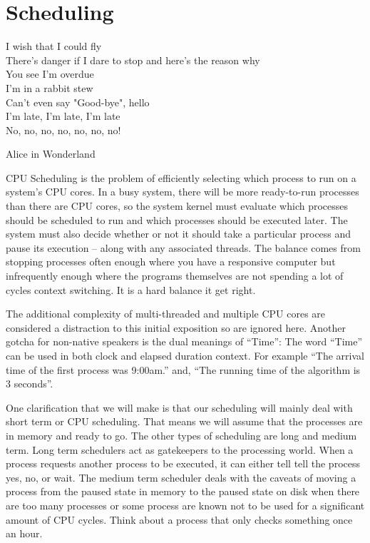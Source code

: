 \chapter{Scheduling}

\epigraph{I wish that I could fly\\
There's danger if I dare to stop and here's the reason why\\
You see I'm overdue\\
I'm in a rabbit stew\\
Can't even say "Good-bye", hello\\
I'm late, I'm late, I'm late\\
No, no, no, no, no, no, no!}{Alice in Wonderland}

CPU Scheduling is the problem of efficiently selecting which process to run on a system's CPU cores.
In a busy system, there will be more ready-to-run processes than there are CPU cores, so the system kernel must evaluate which processes should be scheduled to run and which processes should be executed later.
The system must also decide whether or not it should take a particular process and pause its execution -- along with any associated threads.
The balance comes from stopping processes often enough where you have a responsive computer but infrequently enough where the programs themselves are not spending a lot of cycles context switching.
It is a hard balance it get right.

The additional complexity of multi-threaded and multiple CPU cores are considered a distraction to this initial exposition so are ignored here.
Another gotcha for non-native speakers is the dual meanings of ``Time'': The word ``Time'' can be used in both clock and elapsed duration context.
For example ``The arrival time of the first process was 9:00am.'' and, ``The running time of the algorithm is 3 seconds''.

One clarification that we will make is that our scheduling will mainly deal with short term or CPU scheduling.
That means we will assume that the processes are in memory and ready to go.
The other types of scheduling are long and medium term.
Long term schedulers act as gatekeepers to the processing world.
When a process requests another process to be executed, it can either tell tell the process yes, no, or wait.
The medium term scheduler deals with the caveats of moving a process from the paused state in memory to the paused state on disk when there are too many processes or some process are known not to be used for a significant amount of CPU cycles.
Think about a process that only checks something once an hour.


